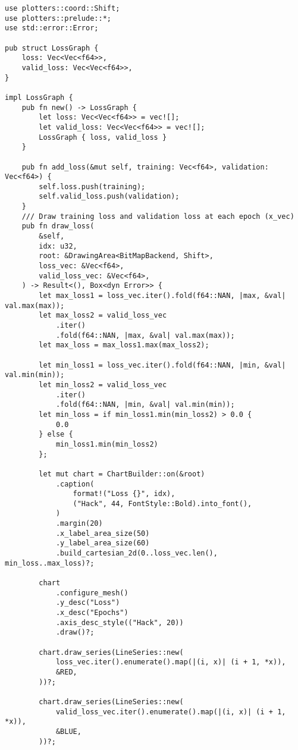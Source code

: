 \begin{verbatim}      
use plotters::coord::Shift;
use plotters::prelude::*;
use std::error::Error;

pub struct LossGraph {
    loss: Vec<Vec<f64>>,
    valid_loss: Vec<Vec<f64>>,
}

impl LossGraph {
    pub fn new() -> LossGraph {
        let loss: Vec<Vec<f64>> = vec![];
        let valid_loss: Vec<Vec<f64>> = vec![];
        LossGraph { loss, valid_loss }
    }

    pub fn add_loss(&mut self, training: Vec<f64>, validation: Vec<f64>) {
        self.loss.push(training);
        self.valid_loss.push(validation);
    }
    /// Draw training loss and validation loss at each epoch (x_vec)
    pub fn draw_loss(
        &self,
        idx: u32,
        root: &DrawingArea<BitMapBackend, Shift>,
        loss_vec: &Vec<f64>,
        valid_loss_vec: &Vec<f64>,
    ) -> Result<(), Box<dyn Error>> {
        let max_loss1 = loss_vec.iter().fold(f64::NAN, |max, &val| val.max(max));
        let max_loss2 = valid_loss_vec
            .iter()
            .fold(f64::NAN, |max, &val| val.max(max));
        let max_loss = max_loss1.max(max_loss2);

        let min_loss1 = loss_vec.iter().fold(f64::NAN, |min, &val| val.min(min));
        let min_loss2 = valid_loss_vec
            .iter()
            .fold(f64::NAN, |min, &val| val.min(min));
        let min_loss = if min_loss1.min(min_loss2) > 0.0 {
            0.0
        } else {
            min_loss1.min(min_loss2)
        };

        let mut chart = ChartBuilder::on(&root)
            .caption(
                format!("Loss {}", idx),
                ("Hack", 44, FontStyle::Bold).into_font(),
            )
            .margin(20)
            .x_label_area_size(50)
            .y_label_area_size(60)
            .build_cartesian_2d(0..loss_vec.len(), min_loss..max_loss)?;

        chart
            .configure_mesh()
            .y_desc("Loss")
            .x_desc("Epochs")
            .axis_desc_style(("Hack", 20))
            .draw()?;

        chart.draw_series(LineSeries::new(
            loss_vec.iter().enumerate().map(|(i, x)| (i + 1, *x)),
            &RED,
        ))?;

        chart.draw_series(LineSeries::new(
            valid_loss_vec.iter().enumerate().map(|(i, x)| (i + 1, *x)),
            &BLUE,
        ))?;


\end{verbatim}
